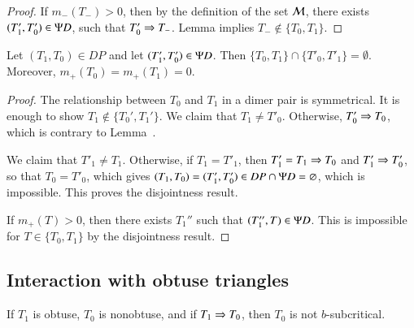 \begin{proof}  
  If $m_-(T_-)>0$, then by the definition of the set $\mathcal M$, there
  exists $(T_1',T_0')\in \Psi D$, such that $T_0'\Rightarrow T_-$.  %
Lemma  implies $T_-\not\in\{T_0,T_1\}$.
\end{proof}

\begin{lemma}  
  Let $(T_1,T_0)\in DP$ and let $(T'_1,T'_0)\in\Psi D$.  Then
  $\{T_0,T_1\}\cap \{T'_0,T'_1\} = \emptyset$.  Moreover,
  $m_+(T_0) = m_+(T_1)=0$.
\end{lemma}

\begin{proof}
  The relationship between $T_0$ and $T_1$ in a dimer pair is
  symmetrical.  It is enough to show $T_1\not\in\{T_0',T_1'\}$.  We
  claim that $T_1\ne T'_0$.  Otherwise, $T'_0\Rightarrow T_0$, which is
  contrary to Lemma~.

  We claim that $T'_1\ne T_1$.  Otherwise, if $T_1=T'_1$, then
  $T'_1=T_1\Rightarrow T_0$ and $T'_1\Rightarrow T'_0$, so that $T_0 = T'_0$, which
  gives $(T_1,T_0)=(T_1',T_0')\in DP\cap\Psi D=\varnothing$, which is impossible. This proves the disjointness result.

  If $m_+(T) >0$, then there exists $T_1''$ such that $(T_1'',T)\in
  \Psi D$.  This is impossible for $T\in\{T_0,T_1\}$ by the disjointness
  result.
\end{proof}

\subsection{Interaction with obtuse triangles}

\begin{lemma}
  If $T_1$ is obtuse, $T_0$ is nonobtuse, and if $T_1 \Rightarrow T_0$, then
  $T_0$ is not $b$-subcritical.
\end{lemma}

